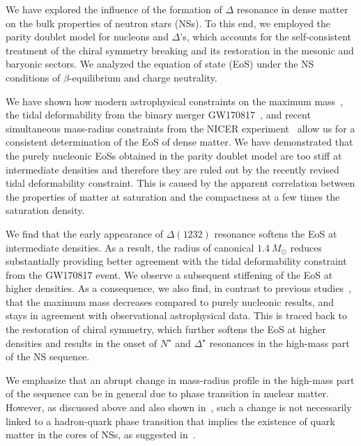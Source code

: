 \documentclass[preprint,showkeys,lengthcheck,nofootinbib,twocolumn,notitlepage,floatfix,superscriptaddress]{revtex4-1}
\begin{document}
We have explored the influence of the formation of $\Delta$ resonance in dense matter on the bulk properties of neutron stars (NSs). To this end, we employed the parity doublet model for nucleons and $\Delta$'s, which accounts for the self-consistent treatment of the chiral symmetry
breaking and its restoration in the mesonic and baryonic sectors. We analyzed the equation of state (EoS) under the NS conditions of $\beta$-equilibrium and charge neutrality.

We have shown how modern astrophysical constraints on the maximum mass~\cite{Fonseca:2021wxt}, the tidal deformability from the binary merger GW170817~\cite{Abbott:2018exr}, and recent simultaneous mass-radius constraints from the NICER experiment~\cite{Miller:2021qha, Miller:2019cac, Riley:2019yda, Riley:2021pdl} allow us for a consistent determination of the EoS of dense matter. We have demonstrated that the purely nucleonic EoSs obtained in the parity doublet model are too stiff at intermediate densities and therefore they are ruled out by the recently revised tidal deformability constraint. This is caused by the apparent correlation between the properties of matter at saturation and the compactness at a few times the saturation density.

We find that the early appearance of $\Delta(1232)$ resonance softens the EoS at intermediate densities. As a result, the radius of canonical $1.4~M_\odot$ reduces substantially providing better agreement with the tidal deformability constraint from the GW170817 event. We observe a subsequent stiffening of the EoS at higher densities. As a consequence, we also find, in contrast to previous studies~\cite{Li:2018qaw}, that the maximum mass decreases compared to purely nucleonic results, and stays in agreement with observational astrophysical data. This is traced back to the restoration of chiral symmetry, which further softens the EoS at higher densities and results in the onset of $N^\star$ and  $\Delta^\star$ resonances in the high-mass part of the NS sequence.

We emphasize that an abrupt change in mass-radius profile in the high-mass part of the sequence  can be in general due to phase transition in nuclear matter. However, as discussed above and also shown in~\cite{Marczenko:2021uaj, Somasundaram:2021clp}, such a change is not necessarily linked to a hadron-quark phase transition that implies the existence of quark matter in the cores of NSs, as suggested in~\cite{Alvarez-Castillo:2016wqj, Li:2021sxb, Christian:2021uhd}.
\end{document}
